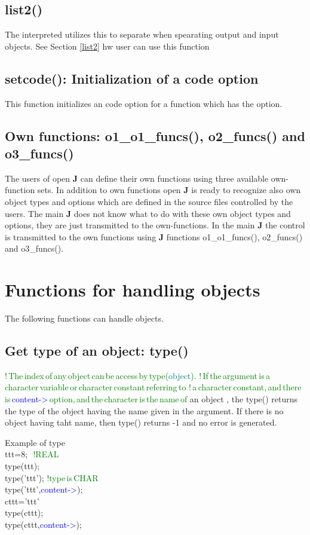 \subsection{\textcolor{VioletRed}{list2}()}
\label{list20}
The interpreted utilizes this to separate when spearating output and input objects.
See Section \ref{list2} hw user can use this function
\subsection{setcode(): Initialization of a code option}
\label{setcode}
This function initializes an code option for a function which has the option.
\subsection{Own functions:  o1\_o1\_funcs(), o2\_funcs() and o3\_funcs()}
\label{own}
The users of open \textbf{J} can define their own functions using three
available own-function sets. In addition to own functions open \textbf{J} is ready to
recognize also own object types and options which are defined in the source files
controlled by the users. The main \textbf{J} does not know what to do with these own
object types and options, they are just transmitted to the own-functions.
In the main \textbf{J} the control is transmitted to the own functions using
\textbf{J} functions o1\_o1\_funcs(), o2\_funcs() and o3\_funcs().
\section{Functions for handling objects}
\label{objects}
The following functions can handle objects.
\subsection{Get type of an object: \textcolor{VioletRed}{type}()}
\label{type}
\textcolor{green}{!\,The\,index\,of\,any\,object\,can\,be\,access\,by\,\textcolor{VioletRed}{type}(\textcolor{teal}{object}).}
\textcolor{green}{!\,If\,the\,argument\,is\,a\,character\,variable\,or\,character\,constant\,referring\,to}
\textcolor{green}{!\,a\,character\,constant,\,and\,there\,is\,\textcolor{blue}{content->}\,option,\,and\,the\,character\,is\,the\,name\,of}
an object , the \textcolor{VioletRed}{type}() returns the type of the object having the name given in the argument.
If there is no object having taht name, then \textcolor{VioletRed}{type}() returns -1 and no error is generated.
\begin{example}[typeex]Example of type\\
\label{typeex}
ttt=8; \,\,\textcolor{green}{!REAL}\\
\textcolor{VioletRed}{type}(ttt);\\
\textcolor{VioletRed}{type}('ttt'); \textcolor{green}{!type\,is\,CHAR}\\
\textcolor{VioletRed}{type}('ttt',\textcolor{blue}{content->});\\
cttt='ttt'\\
\textcolor{VioletRed}{type}(cttt);\\
\textcolor{VioletRed}{type}(cttt,\textcolor{blue}{content->});
\end{example}
